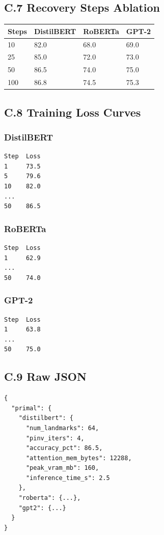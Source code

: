 \subsection{C.7 Recovery Steps Ablation}

\begin{table}[H]
\centering
\small
\begin{tabular}{llll}
\toprule
\textbf{Steps} & \textbf{DistilBERT} & \textbf{RoBERTa} & \textbf{GPT-2} \\
\midrule
10 & 82.0 & 68.0 & 69.0 \\
25 & 85.0 & 72.0 & 73.0 \\
50 & 86.5 & 74.0 & 75.0 \\
100 & 86.8 & 74.5 & 75.3 \\
\bottomrule
\end{tabular}
\end{table}

\subsection{C.8 Training Loss Curves}

\subsubsection{DistilBERT}
\begin{lstlisting}
Step  Loss
1     73.5
5     79.6
10    82.0
...
50    86.5
\end{lstlisting}

\subsubsection{RoBERTa}
\begin{lstlisting}
Step  Loss
1     62.9
...
50    74.0
\end{lstlisting}

\subsubsection{GPT-2}
\begin{lstlisting}
Step  Loss
1     63.8
...
50    75.0
\end{lstlisting}

\subsection{C.9 Raw JSON}

\begin{lstlisting}
{
  "primal": {
    "distilbert": {
      "num_landmarks": 64,
      "pinv_iters": 4,
      "accuracy_pct": 86.5,
      "attention_mem_bytes": 12288,
      "peak_vram_mb": 160,
      "inference_time_s": 2.5
    },
    "roberta": {...},
    "gpt2": {...}
  }
}
\end{lstlisting}

